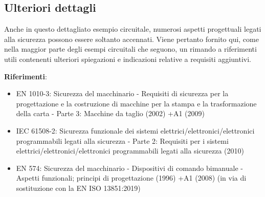 \subsection{Ulteriori dettagli}
\label{subsec:06-5-11}
Anche in questo dettagliato esempio circuitale, numerosi aspetti progettuali legati alla sicurezza possono essere soltanto accennati. Viene pertanto fornito qui, come nella maggior parte degli esempi circuitali che seguono, un rimando a riferimenti utili contenenti ulteriori spiegazioni e indicazioni relative a requisiti aggiuntivi.

\textbf{Riferimenti}:
\begin{itemize}
    \item EN 1010-3: Sicurezza del macchinario - Requisiti di sicurezza per la progettazione e la costruzione di macchine per la stampa e la trasformazione della carta - Parte 3: Macchine da taglio (2002) +A1 (2009)
    \item IEC 61508-2: Sicurezza funzionale dei sistemi elettrici/elettronici/elettronici programmabili legati alla sicurezza - Parte 2: Requisiti per i sistemi elettrici/elettronici/elettronici programmabili legati alla sicurezza (2010)
    \item EN 574: Sicurezza del macchinario - Dispositivi di comando bimanuale - Aspetti funzionali; principi di progettazione (1996) +A1 (2008) (in via di sostituzione con la EN ISO 13851:2019)
\end{itemize}

